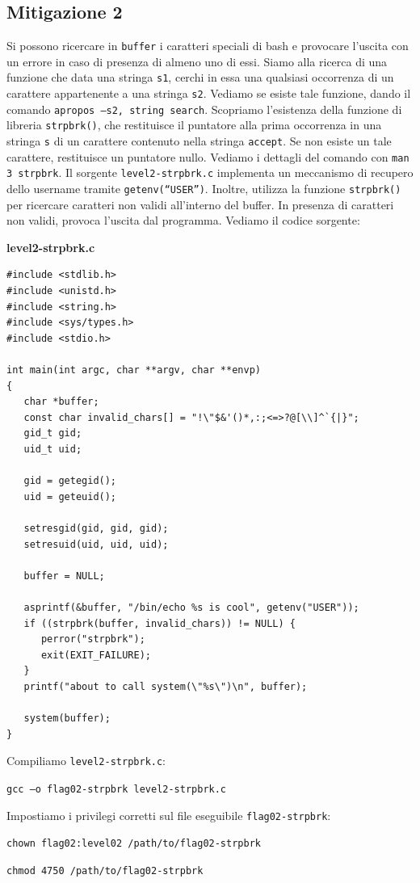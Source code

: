 \subsection{Mitigazione 2}
Si possono ricercare in \texttt{buffer} i caratteri speciali di bash e provocare l'uscita con un errore in caso di presenza di almeno uno di essi. Siamo alla ricerca di una funzione che data una stringa \texttt{s1}, cerchi in essa una qualsiasi occorrenza di un carattere appartenente a una stringa \texttt{s2}. Vediamo se esiste tale funzione, dando il comando \texttt{apropos –s2, string search}. Scopriamo l'esistenza della funzione di libreria
\texttt{strpbrk()}, che restituisce il puntatore alla prima occorrenza in
una stringa \texttt{s} di un carattere contenuto nella
stringa \texttt{accept}. Se non esiste un tale carattere, restituisce un
puntatore nullo. Vediamo i dettagli del comando con
\texttt{man 3 strpbrk}. Il sorgente \texttt{level2-strpbrk.c} implementa
un meccanismo di recupero dello username
tramite \texttt{getenv(“USER”)}. Inoltre, utilizza la funzione \texttt{strpbrk()}
per ricercare caratteri non validi all'interno
del buffer. In presenza di caratteri non validi, provoca
l'uscita dal programma. Vediamo il codice sorgente:
\begin{mdframed}[backgroundcolor=white!20,shadow=false]
\textbf{level2-strpbrk.c}
\begin{verbatim}
#include <stdlib.h>
#include <unistd.h>
#include <string.h>
#include <sys/types.h>
#include <stdio.h>

int main(int argc, char **argv, char **envp)
{
   char *buffer;
   const char invalid_chars[] = "!\"$&'()*,:;<=>?@[\\]^`{|}";
   gid_t gid;
   uid_t uid;
   
   gid = getegid();
   uid = geteuid();
   
   setresgid(gid, gid, gid);
   setresuid(uid, uid, uid);
   
   buffer = NULL;
   
   asprintf(&buffer, "/bin/echo %s is cool", getenv("USER"));
   if ((strpbrk(buffer, invalid_chars)) != NULL) {
      perror("strpbrk");
      exit(EXIT_FAILURE);
   }
   printf("about to call system(\"%s\")\n", buffer);
   
   system(buffer);
}
\end{verbatim}
\end{mdframed}
Compiliamo \texttt{level2-strpbrk.c}:
\begin{center}
    \texttt{gcc –o flag02-strpbrk level2-strpbrk.c}
\end{center}
Impostiamo i privilegi corretti sul file
eseguibile \texttt{flag02-strpbrk}:
\begin{center}
    \texttt{chown flag02:level02 /path/to/flag02-strpbrk}
    
    \texttt{chmod 4750 /path/to/flag02-strpbrk}
\end{center}

